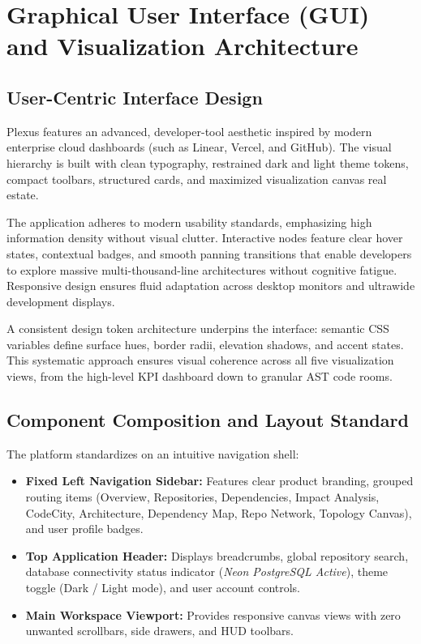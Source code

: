 \documentclass[11pt,a4paper,openany]{report}
\begin{document}
\chapter{Graphical User Interface (GUI) and Visualization Architecture}

\section{User-Centric Interface Design}
Plexus features an advanced, developer-tool aesthetic inspired by modern enterprise cloud dashboards (such as Linear, Vercel, and GitHub). The visual hierarchy is built with clean typography, restrained dark and light theme tokens, compact toolbars, structured cards, and maximized visualization canvas real estate.

The application adheres to modern usability standards, emphasizing high information density without visual clutter. Interactive nodes feature clear hover states, contextual badges, and smooth panning transitions that enable developers to explore massive multi-thousand-line architectures without cognitive fatigue. Responsive design ensures fluid adaptation across desktop monitors and ultrawide development displays.

A consistent design token architecture underpins the interface: semantic CSS variables define surface hues, border radii, elevation shadows, and accent states. This systematic approach ensures visual coherence across all five visualization views, from the high-level KPI dashboard down to granular AST code rooms.

\section{Component Composition and Layout Standard}
The platform standardizes on an intuitive navigation shell:
\begin{itemize}[leftmargin=1.2cm]
    \item \textbf{Fixed Left Navigation Sidebar:} Features clear product branding, grouped routing items (Overview, Repositories, Dependencies, Impact Analysis, CodeCity, Architecture, Dependency Map, Repo Network, Topology Canvas), and user profile badges.
    \item \textbf{Top Application Header:} Displays breadcrumbs, global repository search, database connectivity status indicator (\textit{Neon PostgreSQL Active}), theme toggle (Dark / Light mode), and user account controls.
    \item \textbf{Main Workspace Viewport:} Provides responsive canvas views with zero unwanted scrollbars, side drawers, and HUD toolbars.
\end{itemize}
\end{document}

